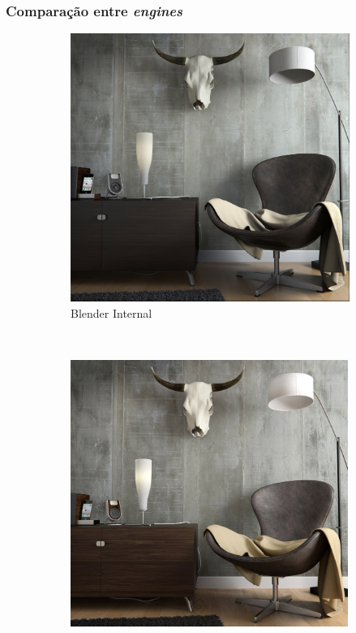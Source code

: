 \documentclass{beamer}
\begin{document}
\begin{frame}

\frametitle{Comparação entre \emph{engines}}

\begin{figure}[!htb]
        \centering
        \begin{subfigure}{0.5\textwidth}
                \includegraphics[width=\textwidth]{blenderInternalRender}
                \caption*{Blender Internal}
        \end{subfigure}%
        ~ %
        \begin{subfigure}{0.5\textwidth}
                \includegraphics[width=\textwidth]{cyclesRender} 

\end{subfigure}
\end{figure}
\end{frame}
\end{document}
